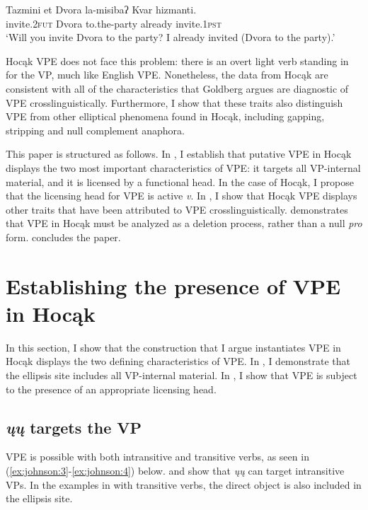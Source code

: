 \documentclass[output=paper]{LSP/langsci}
\begin{document}
\ea\label{ex:johnson:2}
\gll Tazmini {et Dvora} la-misibaʔ Kvar hizmanti.\\
invite.\textsc{2fut} Dvora to.the-party already invite.\textsc{1pst}\\
\trans `Will you invite Dvora to the party? I already invited (Dvora to the party).' \\\citep[14]{Goldberg2005}
\z 

Hocąk VPE does not face this problem: there is an overt light verb standing in for the VP, much like English VPE. Nonetheless, the data from Hocąk are consistent with all of the characteristics that Goldberg argues are diagnostic of VPE crosslinguistically. Furthermore, I show that these traits also distinguish VPE from other elliptical phenomena found in Hocąk, including gapping, stripping and null complement anaphora. 

This paper is structured as follows. In , I establish that putative VPE in Hocąk displays the two most important characteristics of VPE: it targets all VP-internal material, and it is licensed by a functional head. In the case of Hocąk, I propose that the licensing head for VPE is active \emph{v}. In , I show that Hocąk VPE displays other traits that have been attributed to VPE crosslinguistically.  demonstrates that VPE in Hocąk must be analyzed as a deletion process, rather than a null \emph{pro} form.  concludes the paper.

\section{Establishing the presence of VPE in Hocąk}\label{sec:johnson:2}

In this section, I show that the construction that I argue instantiates VPE in Hocąk displays the two defining characteristics of VPE. In , I demonstrate that the ellipsis site includes all VP-internal material. In , I show that VPE is subject to the presence of an appropriate licensing head.

\subsection{\emph{ųų} targets the VP}\label{sec:johnson:2.1}

VPE is possible with both intransitive and transitive verbs, as seen in (\ref{ex:johnson:3}-\ref{ex:johnson:4}) below.  and  show that \emph{ųų} can target intransitive VPs. In the examples in  with transitive verbs, the direct object is also included in the ellipsis site.
 
\end{document}
